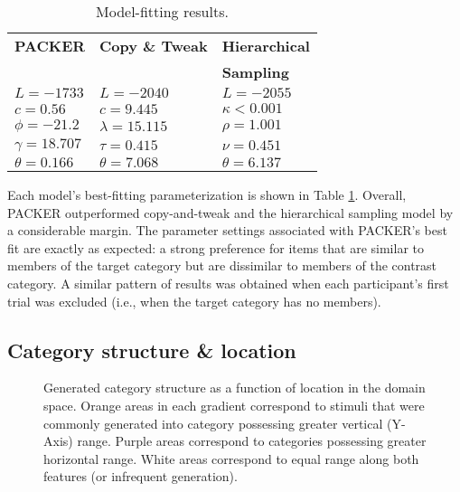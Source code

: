 \documentclass[10pt,letterpaper]{article}
\newcommand\inputpgf[2]{{
\let\pgfimageWithoutPath\pgfimage
\renewcommand{\pgfimage}[2][]{\pgfimageWithoutPath[##1]{#1/##2}}

}}
\begin{document}
\begin{table}
\centering
\caption{Model-fitting results.}
\label{table:model-fits}
\begin{tabular}{ l l l}
\\
 \textbf{PACKER} & \textbf{Copy \& Tweak} & \textbf{Hierarchical} \\
 & & \textbf{Sampling} \\ \hline
 $L = -1733$ & $L = -2040$ & $L = -2055$  \\ 
 $c=0.56$ & $c=9.445$  & $\kappa<0.001$\\
$\phi=-21.2$& $\lambda=15.115$ & $\rho=1.001$ \\ 
$\gamma=18.707$  & $\tau=0.415$ & $\nu=0.451$  \\ 
 $\theta=0.166$  & $\theta=7.068$ & $\theta=6.137$  \\ 
\end{tabular}
\end{table}

Each model's best-fitting parameterization is shown in Table \ref{table:model-fits}. Overall, PACKER outperformed copy-and-tweak and the hierarchical sampling model by a considerable margin. The parameter settings associated with PACKER's best fit are exactly as expected: a strong preference for items that are similar to members of the target category but are dissimilar to members of the contrast category. A similar pattern of results was obtained when each participant's first trial was excluded (i.e., when the target category has no members).



\subsection{Category structure \& location}

\begin{figure}
    \begin{center}
    \inputpgf{figs/}{range-diff-gradient.pgf}
    \caption{Generated category structure as a function of location in the domain space. Orange areas in each gradient correspond to stimuli that were commonly generated into category possessing greater vertical (Y-Axis) range. Purple areas correspond to categories possessing greater horizontal range. White areas correspond to equal range along both features (or infrequent generation).}
    \label{fig:range-diff-gradient}
    \end{center}
\end{figure}
\end{document}

